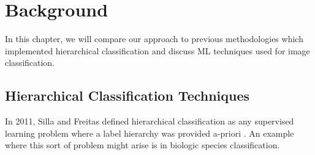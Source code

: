\documentclass[draft, ../thesis.tex]{subfiles}
\begin{document}
\chapter{Background}

In this chapter, we will compare our approach to previous methodologies which implemented hierarchical classification and discuss ML techniques used for image classification.

\section{Hierarchical Classification Techniques}
In 2011, Silla and Freitas defined hierarchical classification as any supervised learning problem where a label hierarchy was provided a-priori \cite{silla2011survey}. An example where this sort of problem might arise is in biologic species classification.
\end{document}
